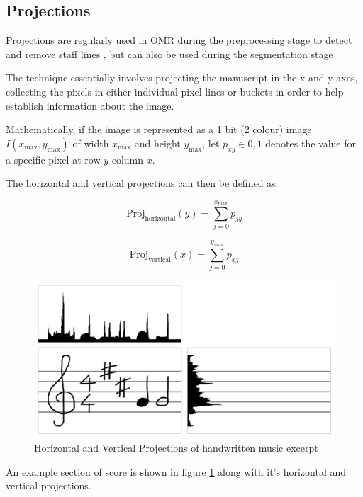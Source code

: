 \subsection{Projections}

Projections are regularly used in OMR during the preprocessing stage to detect and remove staff lines \parencite{rossant2002global}, but can also be used during the segmentation stage

The technique essentially involves projecting the manuscript in the x and y axes, collecting the pixels in either individual pixel lines or buckets in order to help establish information about the image.

Mathematically, if the image is represented as a 1 bit (2 colour) image $I(x_{\text{max}}, y_{\text{max}})$ of width $x_{\text{max}}$ and height $y_{\text{max}}$, let $p_{xy} \in 0, 1$ denotes the value for a specific pixel at row $y$ column $x$.

The horizontal and vertical projections can then be defined as:


\begin{equation} \label{eq:hproj}
  \text{Proj}_{\text{horizontal}}(y) = \sum_{j = 0}^{x_\text{max}} p_{jy}
\end{equation}

\begin{equation} \label{eq:vproj}
  \text{Proj}_{\text{vertical}}(x) = \sum_{j = 0}^{y_\text{max}} p_{xj}
\end{equation}

\begin{figure}[h!]
  \centering
  \includegraphics[width=\linewidth]{gfx/background-omr/projection.png}
  \caption{Horizontal and Vertical Projections of handwritten music excerpt}
  \label{fig:stave-projection}
\end{figure}

An example section of score is shown in figure \ref{fig:stave-projection} along with it's horizontal and vertical projections.


